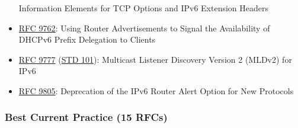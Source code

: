 \documentclass[
]{article}
\begin{document}
\begin{itemize}
  Information Elements for TCP Options and IPv6 Extension Headers
\item
  \href{https://www.rfc-editor.org/info/rfc9762}{RFC 9762}: Using Router
  Advertisements to Signal the Availability of DHCPv6 Prefix Delegation
  to Clients
\item
  \href{https://www.rfc-editor.org/info/rfc9777}{RFC 9777}
  (\href{https://www.rfc-editor.org/info/std101}{STD 101}): Multicast
  Listener Discovery Version 2 (MLDv2) for IPv6
\item
  \href{https://www.rfc-editor.org/info/rfc9805}{RFC 9805}: Deprecation
  of the IPv6 Router Alert Option for New Protocols
\end{itemize}

\subsubsection{Best Current Practice (15
RFCs)}\label{best-current-practice-15-rfcs}
\end{document}
